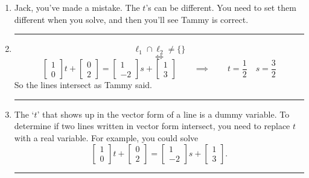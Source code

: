 \documentclass{article}
\begin{document}
	\begin{enumerate}
		\color{Violet} \vspace{.2cm} \hrule

		\item Jack, you've made a mistake. The $t$'s can be different.
			You need to set them different when you solve, and then
			you'll see Tammy is correct.

			\vspace{.2cm} \hrule

		\item
			\[
				\ell_{1}\cap \ell_{2}\neq \{\}
			\]
			\[
				\iff
			\]
			\[
				\begin{bmatrix}
					1\\
					0
				\end{bmatrix}t +
				\begin{bmatrix}
					0\\
					2
				\end{bmatrix}=
				\begin{bmatrix}
					1 \\
					-2
				\end{bmatrix}s +
				\begin{bmatrix}
					1\\
					3
				\end{bmatrix}\qquad\implies\qquad t=\frac{1}{2}\quad
				s=\frac{3}{2}
			\]
			 So the lines intersect as Tammy said. \vspace{.2cm}
			\hrule

		\item The `$t$' that shows up in the vector form of a line is a dummy
			variable. To determine if two lines written in vector form
			intersect, you need to replace $t$ with a real variable.
			For example, you could solve
			\[
				\begin{bmatrix}
					1\\
					0
				\end{bmatrix}t +
				\begin{bmatrix}
					0\\
					2
				\end{bmatrix}=
				\begin{bmatrix}
					1 \\
					-2
				\end{bmatrix}s +
				\begin{bmatrix}
					1\\
					3
				\end{bmatrix}.
			\]
			 \vspace{.2cm} \hrule
	\end{enumerate}
\end{document}

